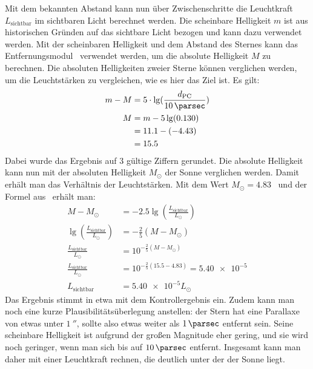\begin{enumerate}
	Mit dem bekannten Abstand kann nun über Zwischenschritte die Leuchtkraft $L_{\text{sichtbar}}$ im sichtbaren Licht berechnet werden. Die scheinbare Helligkeit $m$ ist aus historischen Gründen auf das sichtbare Licht bezogen und kann dazu verwendet werden. Mit der scheinbaren Helligkeit und dem Abstand des Sternes kann das Entfernungsmodul~\cite[S.17]{Cornelsen2013} verwendet werden, um die absolute Helligkeit $M$ zu berechnen. Die absoluten Helligkeiten zweier Sterne können verglichen werden, um die Leuchtstärken zu vergleichen, wie es hier das Ziel ist. Es gilt:
	\begin{align*}
		m-M&=5\cdot\lg(\frac{d_{\text{PC}}}{\SI{10}{\parsec}})\\
		M&=m-5\lg(\num{0.130})\\
		&=\num{11.1}-(-\num{4.43})\\
		&=\num{15.5}
	\end{align*}
	Dabei wurde das Ergebnis auf 3 gültige Ziffern gerundet. Die absolute Helligkeit kann nun mit der absoluten Helligkeit $M_\odot$ der Sonne verglichen werden. Damit erhält man das Verhältnis der Leuchtstärken. Mit dem Wert $M_\odot = \num{4.83}$~\cite[S.46]{Cornelsen2013} und der Formel aus~\cite[S.17]{Cornelsen2013} erhält man:
	\begin{align*}
		M-M_\odot&=-\num{2.5}\lg(\frac{L_{\text{sichtbar}}}{L_\odot})\\
		\lg(\frac{L_{\text{sichtbar}}}{L_\odot})&=-\frac{2}{5}(M-M_\odot)\\
		\frac{L_{\text{sichtbar}}}{L_\odot}&=10^{-\frac{2}{5}(M-M_\odot)}\\
		\frac{L_{\text{sichtbar}}}{L_\odot}&=10^{-\frac{2}{5}(\num{15.5}-\num{4.83})}=\num{5.40e-5}\\
		L_{\text{sichtbar}}&=\num{5.40e-5}L_\odot
	\end{align*}
	Das Ergebnis stimmt in etwa mit dem Kontrollergebnis ein. Zudem kann man noch eine kurze Plausibilitätsüberlegung anstellen: der Stern hat eine Parallaxe von etwas unter $\SI{1}{\arcsecond}$, sollte also etwas weiter als $\SI{1}{\parsec}$ entfernt sein. Seine scheinbare Helligkeit ist aufgrund der großen Magnitude eher gering, und sie wird noch geringer, wenn man sich bis auf $\SI{10}{\parsec}$ entfernt. Insgesamt kann man daher mit einer Leuchtkraft rechnen, die deutlich unter der der Sonne liegt.




\end{enumerate}
